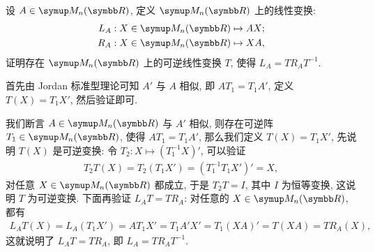 \begin{exercise}[resume=exer]
\begin{answer}
        \end{answer}
        \item 设 $ A \in \MM $, 定义 $ \MM $ 上的线性变换:
        \begin{align*}
            L_{A} : X \in \MM \mapsto AX;\\
            R_{A} : X \in \MM \mapsto XA,
        \end{align*}
        证明存在 $ \MM $ 上的可逆线性变换 $ T $, 使得 $ L_{A} = TR_{A}T^{-1} $.
        \begin{hint}
            首先由 Jordan 标准型理论可知 $ A' $ 与 $ A $ 相似, 即 $ AT_{1} = T_{1}A' $, 定义 $ T(X) = T_{1}X' $, 然后验证即可. 
        \end{hint}
        \begin{answer}
            我们断言 $ A \in \MM $ 与 $ A' $ 相似, 则存在可逆阵 $ T_{1} \in \MM $, 使得 $ AT_{1} = T_{1}A' $, 那么我们定义 $ T(X) = T_{1}X' $, 先说明 $ T(X) $ 是可逆变换: 令 $ T_{2} : X \mapsto (T^{-1}_{1}X)' $, 可以验证
            \begin{align*}
                T_{2}T(X) = T_{2}(T_{1}X') = (T_{1}^{-1}T_{1}X')' = X,
            \end{align*}
            对任意 $ X \in \MM $ 都成立, 于是 $ T_{2}T = I $, 其中 $ I $ 为恒等变换, 这说明 $ T $ 为可逆变换. 下面再验证 $ L_{A}T = TR_{A} $: 对任意的 $ X \in \MM $, 都有
            \begin{align*}
                L_{A}T(X) = L_{A}(T_{1}X') = AT_{1}X' = T_{1}A'X' = T_{1}(XA)' = T(XA) = TR_{A}(X),
            \end{align*} 
            这就说明了 $ L_{A}T = TR_{A} $, 即 $ L_{A} = TR_{A}T^{-1} $.


\end{answer}
\end{exercise}
